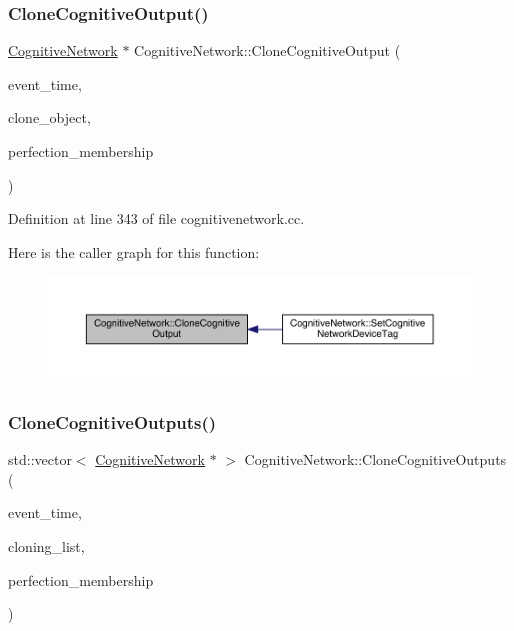 \subsubsection{\texorpdfstring{Clone\+Cognitive\+Output()}{CloneCognitiveOutput()}}
{\footnotesize\ttfamily \hyperlink{class_cognitive_network}{Cognitive\+Network} $\ast$ Cognitive\+Network\+::\+Clone\+Cognitive\+Output (\begin{DoxyParamCaption}\item[{std\+::chrono\+::time\+\_\+point$<$ \hyperlink{universe_8h_a0ef8d951d1ca5ab3cfaf7ab4c7a6fd80}{Clock} $>$}]{event\+\_\+time,  }\item[{\hyperlink{class_cognitive_network}{Cognitive\+Network} $\ast$}]{clone\+\_\+object,  }\item[{double}]{perfection\+\_\+membership }\end{DoxyParamCaption})}



Definition at line 343 of file cognitivenetwork.\+cc.

Here is the caller graph for this function\+:
\nopagebreak
\begin{figure}[H]
\begin{center}
\leavevmode
\includegraphics[width=350pt]{class_cognitive_network_ab24f74115c11275f365245a4bb826c91_icgraph}
\end{center}
\end{figure}
\mbox{\label{class_cognitive_network_a5734aa5378e9b701dca5e98017c1ea35}} 
\subsubsection{\texorpdfstring{Clone\+Cognitive\+Outputs()}{CloneCognitiveOutputs()}}
{\footnotesize\ttfamily std\+::vector$<$ \hyperlink{class_cognitive_network}{Cognitive\+Network} $\ast$ $>$ Cognitive\+Network\+::\+Clone\+Cognitive\+Outputs (\begin{DoxyParamCaption}\item[{std\+::chrono\+::time\+\_\+point$<$ \hyperlink{universe_8h_a0ef8d951d1ca5ab3cfaf7ab4c7a6fd80}{Clock} $>$}]{event\+\_\+time,  }\item[{std\+::vector$<$ \hyperlink{class_cognitive_network}{Cognitive\+Network} $\ast$$>$}]{cloning\+\_\+list,  }\item[{double}]{perfection\+\_\+membership }\end{DoxyParamCaption})}



